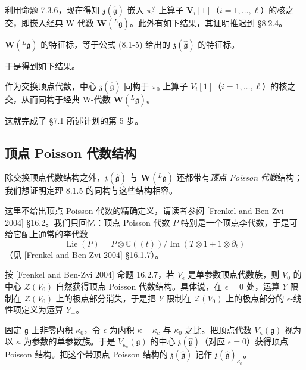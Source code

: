 利用命题 7.3.6，现在得知 $\mathfrak z(\hat{\mathfrak g})$ 嵌入 $\pi^\vee_0$ 上算子 $\mathbf V_i[1]$（$i=1,\dots,\ell$）的核之交，即嵌入经典 W-代数 $\mathbf W({}^L\mathfrak g)$。此外有如下结果，其证明推迟到 §8.2.4。

\begin{lemma}
    $\mathbf W({}^L\mathfrak g)$ 的特征标，等于公式 (8.1-5) 给出的 $\mathfrak z(\hat{\mathfrak g})$ 的特征标。
\end{lemma}


于是得到如下结果。

\begin{theorem}
    作为交换顶点代数，中心 $\mathfrak z(\hat{\mathfrak g})$ 同构于 $\pi_0$ 上算子 $\overline V_i[1]$（$i=1,\dots,\ell$）的核之交，从而同构于经典 W-代数 $\mathbf W({}^L\mathfrak g)$。
\end{theorem}

这就完成了 §7.1 所述计划的第 5 步。

\subsection{顶点 Poisson 代数结构}

除交换顶点代数结构之外，$\mathfrak z(\hat{\mathfrak g})$ 与 $\mathbf W({}^L\mathfrak g)$ 还都带有\emph{顶点 Poisson 代数}结构；我们想证明定理 8.1.5 的同构与这些结构相容。

这里不给出顶点 Poisson 代数的精确定义，请读者参阅 [Frenkel and Ben-Zvi 2004] §16.2。我们只回忆：顶点 Poisson 代数 $P$ 特别是一个顶点李代数，于是可给它配上通常的李代数
\[
    \operatorname{Lie}(P)=P\otimes\mathbb C((t))/\operatorname{Im}(T\otimes1+1\otimes\partial_t)
\]
（见 [Frenkel and Ben-Zvi 2004] §16.1.7）。

按 [Frenkel and Ben-Zvi 2004] 命题 16.2.7，若 $V_\epsilon$ 是单参数顶点代数族，则 $V_0$ 的中心 $\mathcal Z(V_0)$ 自然获得顶点 Poisson 代数结构。具体说，在 $\epsilon=0$ 处，运算 $Y$ 限制在 $\mathcal Z(V_0)$ 上的极点部分消失，于是把 $Y$ 限制在 $\mathcal Z(V_0)$ 上的极点部分的 $\epsilon$-线性项定义为运算 $Y_-$。

固定 $\mathfrak g$ 上非零内积 $\kappa_0$，令 $\epsilon$ 为内积 $\kappa-\kappa_c$ 与 $\kappa_0$ 之比。把顶点代数 $V_\kappa(\mathfrak g)$ 视为以 $\kappa$ 为参数的单参数族。于是 $V_{\kappa_c}(\mathfrak g)$ 的中心 $\mathfrak z(\hat{\mathfrak g})$（对应 $\epsilon=0$）获得顶点 Poisson 结构。把这个带顶点 Poisson 结构的 $\mathfrak z(\hat{\mathfrak g})$ 记作 $\mathfrak z(\hat{\mathfrak g})_{\kappa_0}$。

